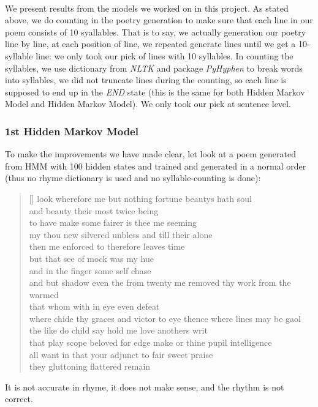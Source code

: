 %
\paragraph{}
We present results from the models we worked on in this project. As stated above, we do counting in the poetry generation to make sure that each line in our poem consists of 10 syallables. That is to say, we actually generation our poetry line by line, at each position of line, we repeated generate lines until we get a 10-syllable line: we only took our pick of lines with 10 syllables. In counting the syllables, we use dictionary from \textit{NLTK} and package \textit{PyHyphen} to break words into syllables, we did not truncate lines during the counting, so each line is supposed to end up in the \textit{END} state (this is the same for both Hidden Markov Model and Hidden Markov Model). We only took our pick at sentence level.
\subsubsection{1st Hidden Markov Model}
To make the improvements we have made clear, let look at a poem generated from HMM with 100 hidden states and trained and generated in a normal order (thus no rhyme dictionary is used and no syllable-counting is done):
\settowidth{\versewidth}{even  see  shall  accessary  used  must  find  and  herself  enfeebled  mine  it}

\begin{verse}[\versewidth]
 look  wherefore  me  but  nothing  fortune  beautys  hath  soul\\
 and  beauty  their  most  twice  being \\
 to  have  make  some  fairer  is  thee  me  seeming \\
 my  thou  new  silvered  unbless  and  till  their  alone \\
 then  me  enforced  to  therefore  leaves  time \\
 but  that  see  of  mock  was  my  hue \\
 and  in  the  finger  some  self  chase \\
 and  but  shadow  even  the  from  twenty  me  removed  thy  work  from  the  warmed \\
 that  whom  with  in  eye  even  defeat \\
 where  chide  thy  graces  and  victor  to  eye  thence  where  lines  may  be  gaol \\
 the  like  do  child  say  hold  me  love  anothers  writ \\
 that  play  scope  beloved  for  edge  make  or  thine  pupil  intelligence \\
 all  want  in  that  your  adjunct  to  fair  sweet  praise \\
 they  gluttoning  flattered  remain \\
\end{verse}
It is not accurate in rhyme, it does not make sense, and the rhythm is not correct.
